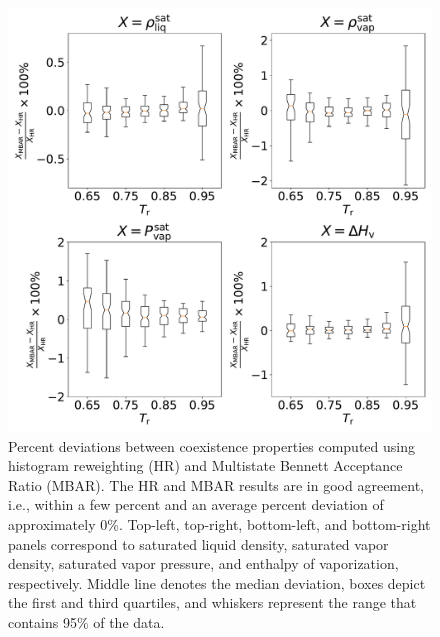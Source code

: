 \documentclass[journal=jced,manuscript=article]{achemso}
\begin{document}

	\begin{figure}[htb!]
		\centering
		\includegraphics[width=6.4in]{Comparison_MBAR_HR_boxplot_CI.pdf}
		\caption{Percent deviations between coexistence properties computed using histogram reweighting (HR) and Multistate Bennett Acceptance Ratio (MBAR). The HR and MBAR results are in good agreement, i.e., within a few percent and an average percent deviation of approximately 0\%. Top-left, top-right, bottom-left, and bottom-right panels correspond to saturated liquid density, saturated vapor density, saturated vapor pressure, and enthalpy of vaporization, respectively. Middle line denotes the median deviation, boxes depict the first and third quartiles, and whiskers represent the range that contains 95\% of the data.}
		\label{fig:comparison MBAR HR}
	\end{figure}


\end{document}
